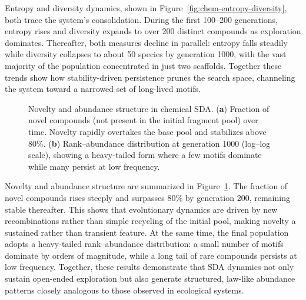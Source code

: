 \documentclass[life,article,submit,pdftex,moreauthors]{Definitions/mdpi}
\begin{document}
Entropy and diversity dynamics, shown in Figure~\ref{fig:chem-entropy-diversity}, both trace the system’s consolidation. During the first 100–200 generations, entropy rises and diversity expands to over 200 distinct compounds as exploration dominates. Thereafter, both measures decline in parallel: entropy falls steadily while diversity collapses to about 50 species by generation 1000, with the vast majority of the population concentrated in just two scaffolds. Together these trends show how stability-driven persistence prunes the search space, channeling the system toward a narrowed set of long-lived motifs.


\begin{figure}[H]
\centering
{}
\hfill
{}
\caption{Novelty and abundance structure in chemical SDA. (\textbf{a}) Fraction of novel compounds (not present in the initial fragment pool) over time. Novelty rapidly overtakes the base pool and stabilizes above 80\%. (\textbf{b}) Rank--abundance distribution at generation 1000 (log--log scale), showing a heavy-tailed form where a few motifs dominate while many persist at low frequency.}
\label{fig:chem-novel-rank}
\end{figure}

Novelty and abundance structure are summarized in Figure~\ref{fig:chem-novel-rank}. The fraction of novel compounds rises steeply and surpasses 80\% by generation 200, remaining stable thereafter. This shows that evolutionary dynamics are driven by new recombinations rather than simple recycling of the initial pool, making novelty a sustained rather than transient feature. At the same time, the final population adopts a heavy-tailed rank--abundance distribution: a small number of motifs dominate by orders of magnitude, while a long tail of rare compounds persists at low frequency. Together, these results demonstrate that SDA dynamics not only sustain open-ended exploration but also generate structured, law-like abundance patterns closely analogous to those observed in ecological systems.
\end{document}
